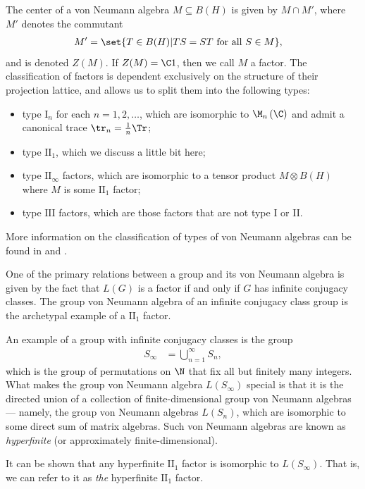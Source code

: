 \documentclass[10pt]{mypackage}
\begin{document}
The center of a von Neumann algebra $M\subseteq B(H)$ is given by $M\cap M'$, where $M'$ denotes the commutant
\begin{align*}
  M' &= \set{T\in B(H) | TS = ST\text{ for all }S\in M},
\end{align*}
and is denoted $Z(M)$. If $Z(M) = \C 1$, then we call $M$ a factor. The classification of factors is dependent exclusively on the structure of their projection lattice, and allows us to split them into the following types:
\begin{itemize}
  \item type $\text{I}_n$ for each $n=1,2,\dots$, which are isomorphic to $\M_n\left( \C \right)$ and admit a canonical trace $\tr_n = \frac{1}{n}\Tr$;
  \item type $\text{II}_1$, which we discuss a little bit here;
  \item type $\text{II}_{\infty}$ factors, which are isomorphic to a tensor product $M\otimes B(H)$ where $M$ is some $\text{II}_1$ factor;
  \item type $\text{III}$ factors, which are those factors that are not type I or II.
\end{itemize}
More information on the classification of types of von Neumann algebras can be found in \cite[Chapter V]{takesaki_1} and \cite[Chapter 7]{conway_operator_theory}.

One of the primary relations between a group and its von Neumann algebra is given by the fact that $L(G)$ is a factor if and only if $G$ has infinite conjugacy classes. The group von Neumann algebra of an infinite conjugacy class group is the archetypal example of a $\text{II}_1$ factor.

An example of a group with infinite conjugacy classes is the group
\begin{align*}
  S_{\infty} &= \bigcup_{n=1}^{\infty}S_n,
\end{align*}
which is the group of permutations on $\N$ that fix all but finitely many integers. What makes the group von Neumann algebra $L\left( S_{\infty} \right)$ special is that it is the directed union of a collection of finite-dimensional group von Neumann algebras --- namely, the group von Neumann algebras $L\left( S_n \right)$, which are isomorphic to some direct sum of matrix algebras. Such von Neumann algebras are known as \textit{hyperfinite} (or approximately finite-dimensional).

It can be shown that any hyperfinite $\text{II}_1$ factor is isomorphic to $L\left( S_{\infty} \right)$. That is, we can refer to it as \textit{the} hyperfinite $\text{II}_1$ factor.
\end{document}
